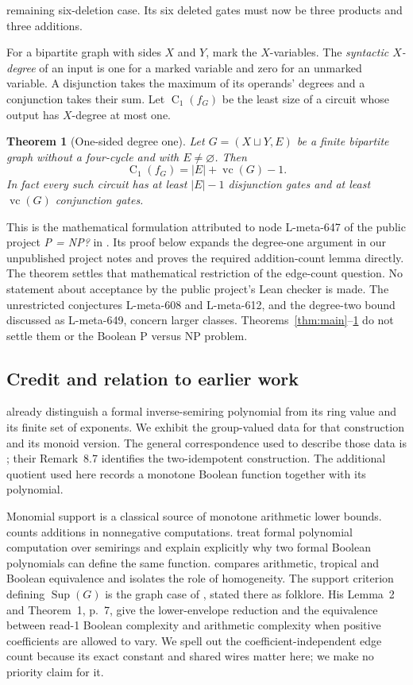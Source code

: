 \documentclass[11pt]{article}
\newcommand{\Sup}{\operatorname{Sup}}
\newcommand{\vc}{\operatorname{vc}}
\newcommand{\cone}{\operatorname{C}_{1}}
\newtheorem{theorem}{Theorem}[section]
\theoremstyle{definition}
\theoremstyle{remark}
\begin{document}
remaining six-deletion case. Its six deleted gates must now be three products and three additions.

For a bipartite graph with sides $X$ and $Y$, mark the $X$-variables. The \emph{syntactic $X$-degree} of an input is one for a marked variable and zero for an unmarked variable. A disjunction takes the maximum of its operands' degrees and a conjunction takes their sum. Let $\cone(f_G)$ be the least size of a circuit whose output has $X$-degree at most one.

\begin{theorem}[One-sided degree one]\label{thm:onesided}
Let $G=(X\sqcup Y,E)$ be a finite bipartite graph without a four-cycle and with $E\ne\varnothing$. Then
\[
 \cone(f_G)=|E|+\vc(G)-1.
\]
In fact every such circuit has at least $|E|-1$ disjunction gates and at least $\vc(G)$ conjunction gates.
\end{theorem}
This is the mathematical formulation attributed to node L-meta-647 of the public project \emph{P = NP?} in \citet{Fleet}. Its proof below expands the degree-one argument in our unpublished project notes \citep{ProjectNotes} and proves the required addition-count lemma directly. The theorem settles that mathematical restriction of the edge-count question. No statement about acceptance by the public project's Lean checker is made. The unrestricted conjectures L-meta-608 and L-meta-612, and the degree-two bound discussed as L-meta-649, concern larger classes. Theorems~\ref{thm:main}--\ref{thm:onesided} do not settle them or the Boolean P versus NP problem.

\subsection{Credit and relation to earlier work}
\citet[Section~5]{FGJM} already distinguish a formal inverse-semiring polynomial from its ring value and its finite set of exponents. We exhibit the group-valued data for that construction and its monoid version. The general correspondence used to describe those data is \citet[Theorem~8.5]{CFMM}; their Remark~8.7 identifies the two-idempotent construction. The additional quotient used here records a monotone Boolean function together with its polynomial.

Monomial support is a classical source of monotone arithmetic lower bounds. \citet{Schnorr} counts additions in nonnegative computations. \citet[Sections~2--4]{JS} treat formal polynomial computation over semirings and explain explicitly why two formal Boolean polynomials can define the same function. \citet[Sections~3--4 and Theorem~9]{JuknaTropical} compares arithmetic, tropical and Boolean equivalence and isolates the role of homogeneity. The support criterion defining $\Sup(G)$ is the graph case of \citet[Lemma~1, p.~5]{JuknaRead}, stated there as folklore. His Lemma~2 and Theorem~1, p.~7, give the lower-envelope reduction and the equivalence between read-1 Boolean complexity and arithmetic complexity when positive coefficients are allowed to vary. We spell out the coefficient-independent edge count because its exact constant and shared wires matter here; we make no priority claim for it.
\end{document}

